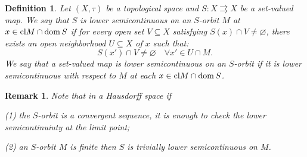 \documentclass{article}
\def\dom{\mathop{\rm dom}}
\newcommand{\cl}{{\rm cl}}
\renewcommand{\emptyset}{\varnothing}
\def\dom{\mathop{\rm dom}}
\def\dom{\mathop{\rm dom}}
\def\text#1{\,\;\hbox{#1}\;\,}
\newcommand{\N}{\mathbb{N}}
\newcommand{\R}{\mathbb{R}}
\newtheorem{defi}[theo]{Definition}
\newtheorem{rem}[theo]{Remark}
\newtheorem{examp}[theo]{Example}
\begin{document}
\begin{defi}
   \label{lower_on_orbit} Let $(X, \tau)$ be a topological space and $S:X\rightrightarrows X$ be a set-valued map. We say that $S$ is lower semicontinuous on an $S$-orbit $M$ at $x \in \cl M \cap \dom S$  if for every open set $V \subseteq X$ satisfying $S(x) \cap V \neq \emptyset$, there exists an open neighborhood $U \subseteq X$ of $x$ such that:
   $$S(x') \cap V \neq \emptyset \quad \forall x' \in U \cap M.$$
We say that a set-valued map is lower semicontinuous on an $S$-orbit if it is lower semicontinuous with respect to $M$ at each $x \in \cl M \cap \dom S$. 
  \end{defi}

\begin{rem} \label{rem} Note that in a Hausdorff space if

(1) the $S$-orbit is a convergent sequence, it is enough to check the lower semicontinuiuty at the limit point;

(2) an $S$-orbit $M$ is finite then $S$ is trivially lower semicontinuous on $M$.

\end{rem}





\end{document}
